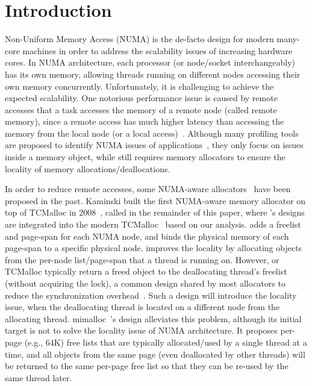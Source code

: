 
\section{Introduction}
\label{sec:intro}


Non-Uniform Memory Access (NUMA) is the de-facto design for modern many-core machines in order to address the scalability issues of increasing hardware cores. In NUMA architecture, each processor (or node/socket interchangeably) has its own memory, allowing threads running on different nodes accessing their own memory concurrently. Unfortunately, it is challenging to achieve the expected scalability. One notorious performance issue is caused by remote accesses that a task accesses the memory of a remote node (called remote memory), since a remote access has much higher latency than accessing the memory from the local node (or a local access)~\cite{Blagodurov:2011:CNC:2002181.2002182}. Although many profiling tools are proposed to identify NUMA issues of applications~\cite{Intel:VTune, Memphis, Lachaize:2012:MMP:2342821.2342826, XuNuma, NumaMMA, 7847070, NumaPerf}, they only focus on issues inside a memory object, while still requires memory allocators to ensure the locality of memory allocations/deallocations. 

In order to reduce remote accesses, some NUMA-aware allocators~\cite{tcmallocnuma, kim2013node, yang2019jarena} have been proposed in the past. Kaminski built the first NUMA-aware memory allocator on top of TCMalloc in 2008~\cite{tcmallocnuma}, called \TN{} in the remainder of this paper, where \TN{}'s designs are integrated into the modern TCMalloc~\cite{tcmalloc2} based on our analysis. \TN{} adds a freelist and page-span for each NUMA node, and binds the physical memory of each page-span to a specific physical node. \TN{} improves the locality by allocating objects from the per-node list/page-span that a thread is running on. However, \TN{} or TCMalloc typically return a freed object to the deallocating thread's freelist (without acquiring the lock), a common design shared by most allocators to reduce the synchronization overhead~\cite{Hoard}. Such a design will introduce the locality issue, when the deallocating thread is located on a different node from the allocating thread.  
mimalloc~\cite{mimalloc}'s design alleviates this problem, although its initial target is not to solve the locality issue of NUMA architecture. It proposes per-page (e.g., 64K) free lists that are typically allocated/used by a single thread at a time, and all objects from the same page (even deallocated by other threads) will be returned to the same per-page free list so that they can be re-used by the same thread later. 


